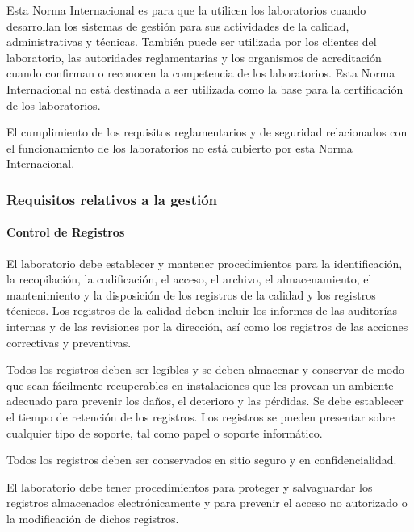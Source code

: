 \par \noindent
Esta Norma Internacional es para que la utilicen los laboratorios cuando desarrollan los sistemas de
gestión para sus actividades de la calidad, administrativas y técnicas. También puede ser utilizada por los clientes del laboratorio, las autoridades reglamentarias y los organismos de acreditación cuando confirman o reconocen la competencia de los laboratorios. Esta Norma Internacional no está destinada a ser utilizada
como la base para la certificación de los laboratorios.

\par \noindent
El cumplimiento de los requisitos reglamentarios y de seguridad relacionados con el funcionamiento de
los laboratorios no está cubierto por esta Norma Internacional.

\subsubsection{Requisitos relativos a la gestión}

\paragraph{Control de Registros} 
El laboratorio debe establecer y mantener procedimientos para la identificación, la recopilación,
la codificación, el acceso, el archivo, el almacenamiento, el mantenimiento y la disposición de los registros de
la calidad y los registros técnicos. Los registros de la calidad deben incluir los informes de las auditorías
internas y de las revisiones por la dirección, así como los registros de las acciones correctivas y preventivas.

\par \noindent
Todos los registros deben ser legibles y se deben almacenar y conservar de modo que sean
fácilmente recuperables en instalaciones que les provean un ambiente adecuado para prevenir los daños, el deterioro y las pérdidas. Se debe establecer el tiempo de retención de los registros. Los registros se pueden presentar sobre cualquier tipo de soporte, tal como papel o soporte informático.

\par \noindent
Todos los registros deben ser conservados en sitio seguro y en confidencialidad.

\par \noindent
El laboratorio debe tener procedimientos para proteger y salvaguardar los registros almacenados
electrónicamente y para prevenir el acceso no autorizado o la modificación de dichos registros.

